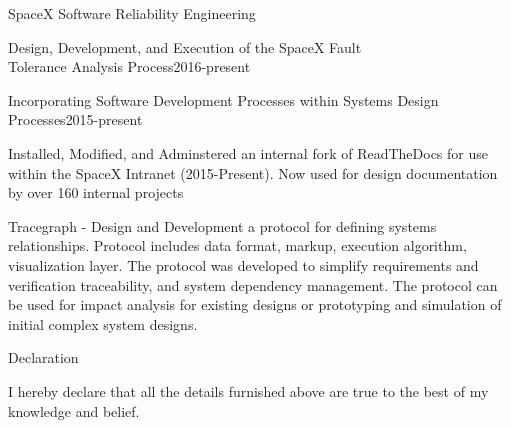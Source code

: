 \documentclass{resume} %
\begin{document}
\begin{rSection}{SpaceX Software Reliability Engineering}
\begin{rSubsection}{Design, Development, and Execution of the SpaceX Fault\\
    Tolerance Analysis Process}{2016-present}{}
\end{rSubsection}


\begin{rSubsection}{Incorporating Software Development Processes within Systems Design Processes}{2015-present}{}{}

\item Installed, Modified, and Adminstered an internal fork of ReadTheDocs for
  use within the SpaceX Intranet (2015-Present). Now used for design
  documentation by over 160 internal projects
\item Tracegraph - Design and Development a protocol for defining systems
  relationships. Protocol includes data format, markup, execution algorithm,
  visualization layer. The protocol was developed to simplify requirements and
  verification traceability, and system dependency management. The protocol can
  be used for impact analysis for existing designs or prototyping and simulation
  of initial complex system designs.
\end{rSubsection}

\end{rSection}



\begin{rSection}{ Declaration  } \itemsep -3pt

\item I hereby declare that all the details furnished above are true to the best of my knowledge and belief.

\end{rSection}
\end{document}
